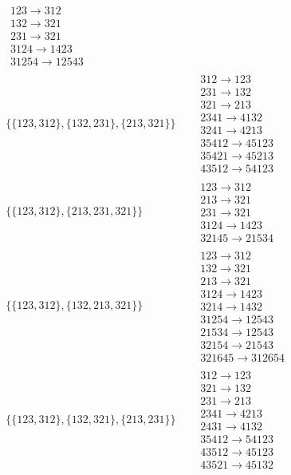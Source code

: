 \begin{tiny}
\begin{align}
\begin{matrix}
123 \to 312\\132 \to 321\\231 \to 321\\3124 \to 1423\\31254 \to 12543
\end{matrix}
\\
\{\{123, 312\}, \{132, 231\}, \{213, 321\}\}
\quad
&
\begin{matrix}
312 \to 123\\231 \to 132\\321 \to 213\\2341 \to 4132\\3241 \to 4213\\35412 \to 45123\\35421 \to 45213\\43512 \to 54123
\end{matrix}
\\
\{\{123, 312\}, \{213, 231, 321\}\}
\quad
&
\begin{matrix}
123 \to 312\\213 \to 321\\231 \to 321\\3124 \to 1423\\32145 \to 21534
\end{matrix}
\\
\{\{123, 312\}, \{132, 213, 321\}\}
\quad
&
\begin{matrix}
123 \to 312\\132 \to 321\\213 \to 321\\3124 \to 1423\\3214 \to 1432\\31254 \to 12543\\21534 \to 12543\\32154 \to 21543\\321645 \to 312654
\end{matrix}
\\
\{\{123, 312\}, \{132, 321\}, \{213, 231\}\}
\quad
&
\begin{matrix}
312 \to 123\\321 \to 132\\231 \to 213\\2341 \to 4213\\2431 \to 4132\\35412 \to 54123\\43512 \to 45123\\43521 \to 45132
\end{matrix}
\\

\end{align}
\end{tiny}
